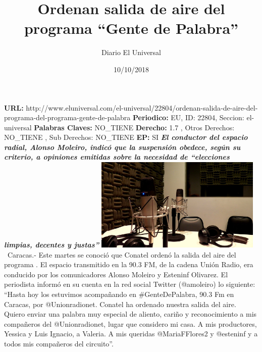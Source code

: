 \documentclass{article}%
\title{\textbf{Ordenan salida de aire del programa “Gente de Palabra”}}%
\author{Diario El Universal}%
\date{10/10/2018}%
\begin{document}
%
\normalsize%
\maketitle%
\textbf{URL: }%
http://www.eluniversal.com/el{-}universal/22804/ordenan{-}salida{-}de{-}aire{-}del{-}programa{-}del{-}programa{-}gente{-}de{-}palabra\newline%
%
\textbf{Periodico: }%
EU, %
ID: %
22804, %
Seccion: %
el{-}universal\newline%
%
\textbf{Palabras Claves: }%
NO\_TIENE\newline%
%
\textbf{Derecho: }%
1.7%
, Otros Derechos: %
NO\_TIENE%
, Sub Derechos: %
NO\_TIENE%
\newline%
%
\textbf{EP: }%
SI\newline%
\newline%
%
\textbf{\textit{El conductor del espacio radial, Alonso Moleiro, indicó que la suspensión obedece, según su criterio, a opiniones emitidas sobre la necesidad de “elecciones limpias, decentes y justas”}}%
\newline%
\newline%
%
\includegraphics[width=300px]{106.jpg}%
\newline%
%
~Caracas.{-} Este martes se conoció que Conatel ordenó la salida del aire del programa%
\newline%
%
. El espacio transmitido en la 90.3 FM, de la cadena Unión Radio, era conducido por los  comunicadores Alonso Moleiro y Esteninf Olivarez.%
\newline%
%
El periodista informó en su cuenta en la red social Twitter (@amoleiro)  lo siguiente: “Hasta hoy los estuvimos acompañando en \#GenteDePalabra, 90.3 Fm en Caracas, por @Unionradionet. Conatel ha ordenado nuestra salida del aire. Quiero enviar una palabra muy especial de aliento, cariño y reconocimiento a mis compañeros del @Unionradionet, lugar que considero mi casa. A mis productores, Yessica y Luis Ignacio, a Valeria. A mis queridas @MariaFFlores2 y @esteninf y a todos mis compañeros del circuito”.%
\newline%
\end{document}
